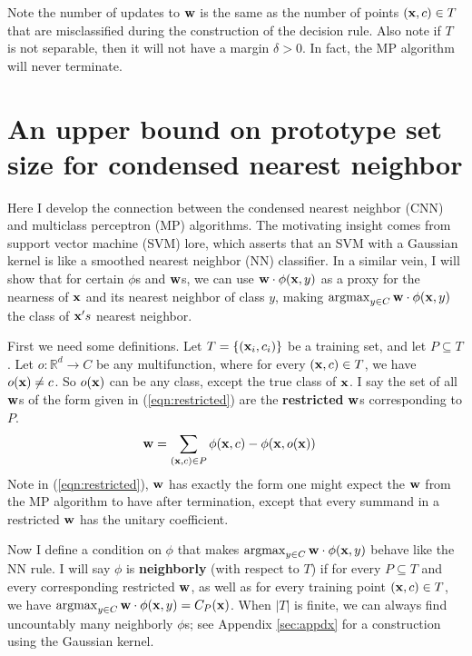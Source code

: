 \documentclass{article}
\newcommand{\R}{ \mbox{${\mathbb R}$}}
\newcommand{\argmax}{\operatornamewithlimits{argmax}}
\begin{document}
Note the number of updates to ${\bf w}$ is the same as the number of points $({\bf x},c) \in T$ that are misclassified during the construction of the decision rule. Also note if $T$ is not separable, then it will not have a margin $\delta > 0$. In fact, the MP algorithm will never terminate.

\section{An upper bound on prototype set size for condensed nearest neighbor}
Here I develop the connection between the condensed nearest neighbor (CNN) and multiclass perceptron (MP) algorithms. The motivating insight comes from support vector machine (SVM) lore, which asserts that an SVM with a Gaussian kernel is like a smoothed nearest neighbor (NN) classifier. In a similar vein, I will show that for certain $\phi$s and ${\bf w}$s, we can use ${\bf w} \cdot \phi({\bf x},y)$ as a proxy for the nearness of ${\bf x}$ and its nearest neighbor of class $y$, making $\argmax_{y \in C} {\bf w} \cdot \phi({\bf x},y)$ the class of ${\bf x}'s$ nearest neighbor.

First we need some definitions. Let $T = \{ ({\bf x}_i, c_i) \}$ be a training set, and let $P \subseteq T$. Let $o:\R^d \rightarrow C$ be any multifunction, where for every $({\bf x},c) \in T$, we have $o({\bf x}) \neq c$. 
So $o({\bf x})$ can be any class, except the true class of ${\bf x}$.
I say the set of all ${\bf w}$s of the form given in (\ref{eqn:restricted}) are the \textbf{restricted} ${\bf w}$s corresponding to $P$.
\begin{align}
{\bf w} 
&= \sum_{({\bf x},c) \in P} \phi({\bf x},c) - \phi({\bf x},o({\bf x}))\label{eqn:restricted}
\end{align}
Note in (\ref{eqn:restricted}), ${\bf w}$ has exactly the form one might expect the ${\bf w}$ from the MP algorithm to have after termination, except that every summand in a restricted ${\bf w}$ has the unitary coefficient.

Now I define a condition on $\phi$ that makes $\argmax_{y \in C} {\bf w} \cdot \phi({\bf x},y)$ behave like the NN rule. I will say $\phi$ is \textbf{neighborly} (with respect to $T$) if for every $P \subseteq T$ and every corresponding restricted ${\bf w}$, as well as for every training point $({\bf x},c) \in T$, we have $\argmax_{y \in C} {\bf w} \cdot \phi({\bf x},y) = C_P({\bf x})$. When $|T|$ is finite, we can always find uncountably many neighborly $\phi$s; see Appendix \ref{sec:appdx} for a construction using the Gaussian kernel.
\end{document}
